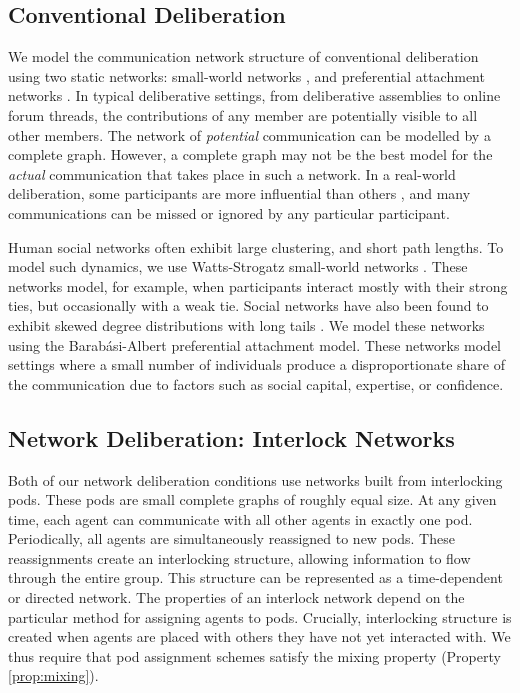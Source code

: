 \subsection{Conventional Deliberation}
We model the communication network structure of conventional deliberation using two static networks: small-world networks \cite{watts_collective_1998}, and preferential attachment networks \cite{barabasi_emergence_1999}. In typical deliberative settings, from deliberative assemblies to online forum threads, the contributions of any member are potentially visible to all other members.
The network of {\em potential} communication can be modelled by a complete graph.
However, a complete graph may not be the best model for the {\em actual} communication that takes place in such a network. In a real-world deliberation, some participants are more influential than others \cite{goel_structure_2012, shaw_laboratories_2014}, and many communications can be missed or ignored by any particular participant.

Human social networks often exhibit large clustering, and short path lengths.
To model such dynamics, we use Watts-Strogatz small-world networks  \cite{watts_collective_1998}.
These networks model, for example, when participants interact mostly with their strong ties, but occasionally with a weak tie. Social networks have also been found to exhibit skewed degree distributions with long tails \cite{barabasi_emergence_1999}.
We model these networks using the Barabási-Albert preferential attachment model.
These networks model settings where a small number of individuals produce a disproportionate share of the communication due to factors such as social capital, expertise, or confidence.

\subsection{Network Deliberation: Interlock Networks}
Both of our network deliberation conditions use networks built from interlocking pods.
These pods are small complete graphs of roughly equal size.
At any given time, each agent can communicate with all other agents in exactly one pod.
Periodically, all agents are simultaneously reassigned to new pods.
These reassignments create an interlocking structure, allowing information to flow through the entire group.
This structure can be represented as a time-dependent or directed network.
The properties of an interlock network depend on the particular method for assigning agents to pods.
Crucially, interlocking structure is created when agents are placed with others they have not yet interacted with.
We thus require that pod assignment schemes satisfy the mixing property (Property \ref{prop:mixing}).

